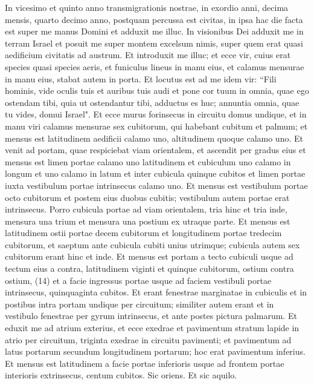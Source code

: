 \begin{biblechapter}  
\verse In vicesimo et quinto anno transmigrationis nostrae, in exordio anni, decima mensis, quarto decimo anno, postquam percussa est civitas, in ipsa hac die facta est super me manus Domini et adduxit me illuc. 
\verse In visionibus Dei adduxit me in terram Israel et posuit me super montem excelsum nimis, super quem erat quasi aedificium civitatis ad austrum. 
\verse Et introduxit me illuc; et ecce vir, cuius erat species quasi species aeris, et funiculus lineus in manu eius, et calamus mensurae in manu eius, stabat autem in porta. 
\verse Et locutus est ad me idem vir: “Fili hominis, vide oculis tuis et auribus tuis audi et pone cor tuum in omnia, quae ego ostendam tibi, quia ut ostendantur tibi, adductus es huc; annuntia omnia, quae tu vides, domui Israel". 
\verse Et ecce murus forinsecus in circuitu domus undique, et in manu viri calamus mensurae sex cubitorum, qui habebant cubitum et palmum; et mensus est latitudinem aedificii calamo uno, altitudinem quoque calamo uno. 
\verse Et venit ad portam, quae respiciebat viam orientalem, et ascendit per gradus eius et mensus est limen portae calamo uno latitudinem 
\verse et cubiculum uno calamo in longum et uno calamo in latum et inter cubicula quinque cubitos et limen portae iuxta vestibulum portae intrinsecus calamo uno. 
\verse Et mensus est vestibulum portae 
\verse octo cubitorum et postem eius duobus cubitis; vestibulum autem portae erat intrinsecus. 
\verse Porro cubicula portae ad viam orientalem, tria hinc et tria inde, mensura una trium et mensura una postium ex utraque parte. 
\verse Et mensus est latitudinem ostii portae decem cubitorum et longitudinem portae tredecim cubitorum, 
\verse et saeptum ante cubicula cubiti unius utrimque; cubicula autem sex cubitorum erant hinc et inde. 
\verse Et mensus est portam a tecto cubiculi usque ad tectum eius a contra, latitudinem viginti et quinque cubitorum, ostium contra ostium, (14) 
\verse et a facie ingressus portae usque ad faciem vestibuli portae intrinsecus, quinquaginta cubitos. 
\verse Et erant fenestrae marginatae in cubiculis et in postibus intra portam undique per circuitum; similiter autem erant et in vestibulo fenestrae per gyrum intrinsecus, et ante postes pictura palmarum. 
\verse Et eduxit me ad atrium exterius, et ecce exedrae et pavimentum stratum lapide in atrio per circuitum, triginta exedrae in circuitu pavimenti; 
\verse et pavimentum ad latus portarum secundum longitudinem portarum; hoc erat pavimentum inferius. 
\verse Et mensus est latitudinem a facie portae inferioris usque ad frontem portae interioris extrinsecus, centum cubitos. Sic oriens. Et sic aquilo. 

\end{biblechapter}
